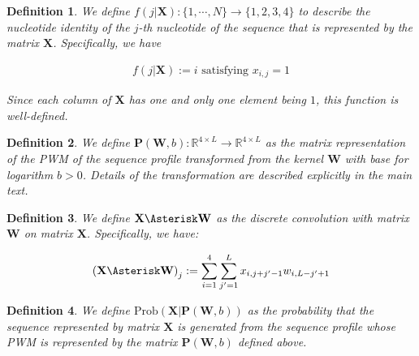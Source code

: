 \documentclass[12pt]{article}
\newcommand{\matrixSymbol}[1]{\mathbf{#1}}
\newtheorem{definition}{Definition}
\begin{document}
\begin{definition}
We define $ f(j|\matrixSymbol{X}) : \{1, \cdots, N\} \rightarrow \{1, 2, 3, 4\}$ to describe the nucleotide identity of the $j$-th nucleotide of the sequence that is represented by the matrix $\matrixSymbol{X}$. Specifically, we have

\begin{align}
 f(j|\matrixSymbol{X}) := i \text{  satisfying  } x_{i,j} = 1 
\end{align}

Since each column of $\matrixSymbol{X}$ has one and only one element being $1$, this function is well-defined. 




\end{definition}


\begin{definition}
We define $\matrixSymbol{P}(\matrixSymbol{W}, b) : \mathbb{R}^{4 \times L} \rightarrow \mathbb{R}^{4 \times L} $ as the matrix representation of the PWM of the sequence profile transformed from the kernel $\matrixSymbol{W}$ with base for logarithm $b >0$. Details of the transformation are described explicitly in the main text.
\end{definition}

\begin{definition}
We define $\matrixSymbol{X} \Asterisk \matrixSymbol{W}$ as the discrete convolution with matrix $\matrixSymbol{W}$ on matrix $\matrixSymbol{X}$. Specifically, we have:

\begin{align}
  \left( \matrixSymbol{X} \Asterisk \matrixSymbol{W} \right)_{j} := \sum_{i=1}^{4}{\sum_{j'=1}^{L}{x_{i, j+j'-1}w_{i, L-j'+1}}} 
\end{align}
\end{definition}

\begin{definition}
We define $\mathrm{Prob}(\matrixSymbol{X}|\matrixSymbol{P}(\matrixSymbol{W}, b))$ as the probability that the sequence represented by matrix $\matrixSymbol{X}$ is generated from the sequence profile whose PWM is represented by the matrix $\matrixSymbol{P}(\matrixSymbol{W}, b)$ defined above.
\end{definition}
\end{document}
